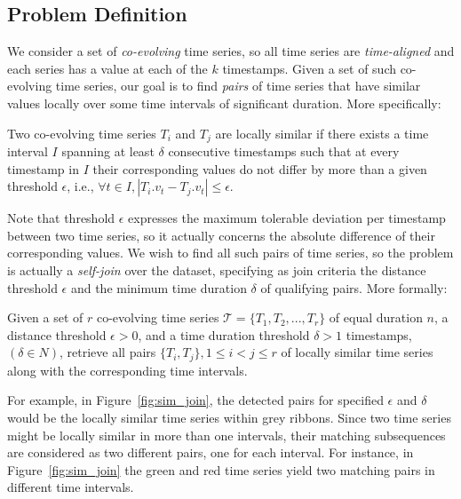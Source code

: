 
\subsection{Problem Definition}
\label{subsec:local_sim_join_problem}

\graphicspath{{Papers/SSTD2019/}{Papers/SIGSpatial2019/}}

We consider a set of {\em co-evolving} time series, so all time series are {\em time-aligned} and each series has a value at each of the $k$ timestamps. Given a set of such co-evolving time series, our goal is to find {\em pairs} of time series that have similar values locally over some time intervals of significant duration. More specifically:

\begin{mydefinition}
Two co-evolving time series $Τ_i$ and $Τ_j$ are locally similar if there exists a time interval $I$ spanning at least $\delta$ consecutive timestamps such that at every timestamp in $I$ their corresponding values do not differ by more than a given threshold $\epsilon$, i.e., $\forall t \in I, |T_i.v_t - T_j.v_t| \leq \epsilon$.
\end{mydefinition}

Note that threshold $\epsilon$ expresses the maximum tolerable deviation per timestamp between two time series, so it actually concerns the absolute difference of their corresponding values. We wish to find all such pairs of time series, so the problem is actually a {\em self-join} over the dataset, specifying as join criteria the distance threshold $\epsilon$ and the minimum time duration $\delta$ of qualifying pairs. More formally:

\begin{problem}
Given a set of $r$ co-evolving time series $\mathcal{T}=\{T_1,T_2,...,T_r\}$ of equal duration $n$, a distance threshold $\epsilon>0$, and a time duration threshold $\delta>1$ timestamps, $(\delta \in N)$, retrieve all pairs $\{T_i, T_j\}, 1 \leq i < j \leq r$ of locally similar time series along with the corresponding time intervals.
\end{problem}

For example, in Figure~\ref{fig:sim_join}, the detected pairs for specified $\epsilon$ and $\delta$ would be the locally similar time series within grey ribbons. Since two time series might be locally similar in more than one intervals, their matching subsequences are considered as two different pairs, one for each interval. For instance, in Figure~\ref{fig:sim_join} the green and red time series yield two matching pairs in different time intervals.

